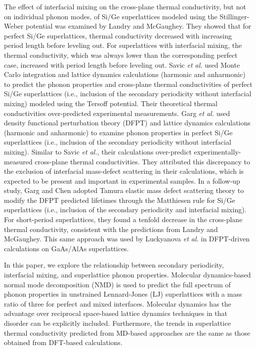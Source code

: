 \documentclass[aps,prb,preprint,preprintnumbers,amsmath,amssymb,floatfix,superscriptaddress]{revtex4}
\begin{document}
The effect of interfacial mixing on the cross-plane thermal conductivity, but not on individual phonon modes, of Si/Ge superlattices modeled using the Stillinger-Weber potential was examined by Landry and McGaughey.\cite{PhysRevB.79.075316} They showed that for perfect Si/Ge superlattices, thermal conductivity decreased with increasing period length before leveling out. For superlattices with interfacial mixing, the thermal conductivity, which was always lower than the corresponding perfect case, increased with period length before leveling out. Savic \textit{et al.} used Monte Carlo integration and lattice dynamics calculations (harmonic and anharmonic) to predict the phonon properties and cross-plane thermal conductivities of perfect Si/Ge superlattices (i.e., inclusion of the secondary periodicity without interfacial mixing) modeled using the Tersoff potential. \cite{savic:073113} Their theoretical thermal conductivities over-predicted experimental measurements. Garg \textit{et al.} used density functional perturbation theory (DFPT) and lattice dynamics calculations (harmonic and anharmonic) to examine phonon properties in perfect Si/Ge superlattices (i.e., inclusion of the secondary periodicity without interfacial mixing).\cite{doi:10.1021/nl202186y} Similar to Savic \textit{et al.}, their calculations over-predict experimentally-measured cross-plane thermal conductivities. They attributed this discrepancy to the exclusion of interfacial mass-defect scattering in their calculations, which is expected to be present and important in experimental samples. In a follow-up study, Garg and Chen adopted Tamura elastic mass defect scattering theory \cite{tamura_isotope_1983} to modify the DFPT predicted lifetimes through the Matthiesen rule for Si/Ge superlattices (i.e., inclusion of the secondary periodicity and interfacial mixing).\cite{PhysRevB.87.140302} For short-period superlattices, they found a tenfold decrease in the cross-plane thermal conductivity, consistent with the predictions from Landry and McGaughey.\cite{PhysRevB.79.075316} This same approach was used by Luckyanova \textit{et al.} \cite{Luckyanova16112012} in DFPT-driven calculations on GaAs/AlAs superlattices.

In this paper, we explore the relationship between secondary periodicity, interfacial mixing, and superlattice phonon properties. Molecular dynamics-based normal mode decomposition (NMD) is used to predict the full spectrum of phonon properties in unstrained Lennard-Jones (LJ) superlattices with a mass ratio of three for perfect and mixed interfaces. Molecular dynamics has the advantage over reciprocal space-based lattice dynamics techniques in that disorder can be explicitly included. Furthermore, the trends in superlattice thermal conductivity predicted from MD-based approaches are the same as those obtained from DFT-based calculations.\cite{PhysRevB.79.075316,PhysRevB.72.174302,doi:10.1021/nl202186y,PhysRevB.87.140302,Luckyanova16112012} 
\end{document}
